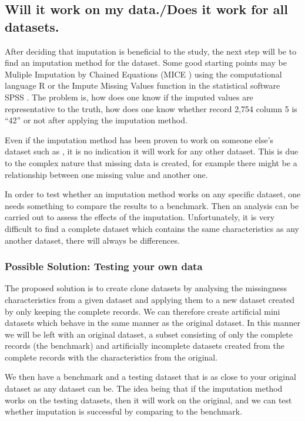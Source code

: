 \documentclass{IEEEconf}
\begin{document}
		\subsection{Will it work on my data./Does it work for all datasets.} %
		\label{sub:will_it_work_on_my_data}
			After deciding that imputation is beneficial to the study, the next step will be to find an imputation method for the dataset. Some good starting points may be Muliple Imputation by Chained Equations (MICE \cite{mice}) using the computational language R \cite{r} or the Impute Missing Values function in the statistical software SPSS \cite{spss}. The problem is, how does one know if the imputed values are representative to the truth, how does one know whether record 2,754 column 5 is ``42'' or not after applying the imputation method.

			Even if the imputation method has been proven to work on someone else's dataset such as \cite{compare}, it is no indication it will work for any other dataset. This is due to the complex nature that missing data is created, for example there might be a relationship between one missing value and another one. 

			In order to test whether an imputation method works on any specific dataset, one needs something to compare the results to a benchmark. Then an analysis can be carried out to assess the effects of the imputation. Unfortunately, it is very difficult to find a complete dataset which contains the same characteristics as any another dataset, there will always be differences. 
			\subsubsection{Possible Solution: Testing your own data} %
			\label{sub:possible_solution}
				The proposed solution is to create clone datasets by analysing the missingness characteristics from a given dataset and applying them to a new dataset created by only keeping the complete records. We can therefore create artificial mini datasets which behave in the same manner as the original dataset. In this manner we will be left with an original dataset, a subset consisting of only the complete records (the benchmark) and artificially incomplete datasets created from the complete records with the characteristics from the original. 

				We then have a benchmark and a testing dataset that is as close to your original dataset as any dataset can be. The idea being that if the imputation method works on the testing datasets, then it will work on the original, and we can test whether imputation is successful by comparing to the benchmark. 
\end{document}
